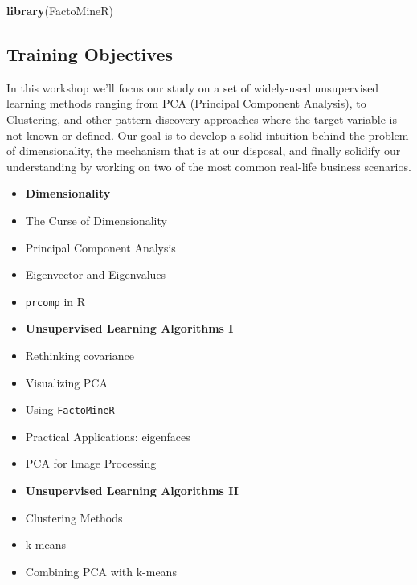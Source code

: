 \documentclass[]{article}
\newenvironment{Shaded}{\begin{snugshade}}{\end{snugshade}}
\newcommand{\KeywordTok}[1]{\textcolor[rgb]{0.13,0.29,0.53}{\textbf{#1}}}
\newcommand{\NormalTok}[1]{#1}
\begin{document}
\begin{Shaded}
\begin{Highlighting}[]
\KeywordTok{library}\NormalTok{(FactoMineR)}
\end{Highlighting}
\end{Shaded}

\hypertarget{training-objectives}{%
\subsection{Training Objectives}\label{training-objectives}}

In this workshop we'll focus our study on a set of widely-used
unsupervised learning methods ranging from PCA (Principal Component
Analysis), to Clustering, and other pattern discovery approaches where
the target variable is not known or defined. Our goal is to develop a
solid intuition behind the problem of dimensionality, the mechanism that
is at our disposal, and finally solidify our understanding by working on
two of the most common real-life business scenarios.

\begin{itemize}
\item
  \textbf{Dimensionality}
\item
  The Curse of Dimensionality\\
\item
  Principal Component Analysis\\
\item
  Eigenvector and Eigenvalues\\
\item
  \texttt{prcomp} in R
\item
  \textbf{Unsupervised Learning Algorithms I}
\item
  Rethinking covariance\\
\item
  Visualizing PCA
\item
  Using \texttt{FactoMineR}
\item
  Practical Applications: eigenfaces
\item
  PCA for Image Processing
\item
  \textbf{Unsupervised Learning Algorithms II}
\item
  Clustering Methods
\item
  k-means\\
\item
  Combining PCA with k-means
\end{itemize}
\end{document}
